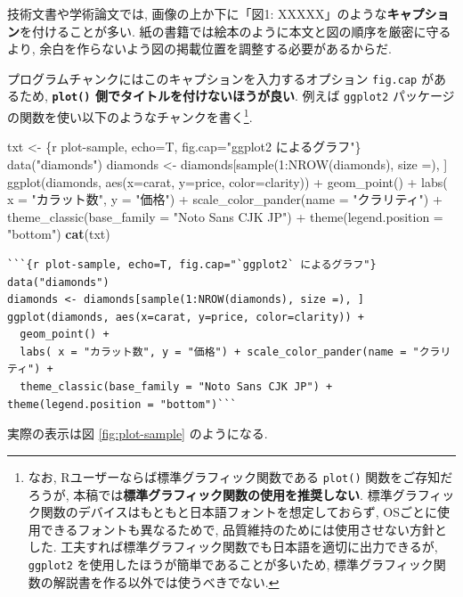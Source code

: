 \documentclass[
  nomag]{bxjsbook}
\newenvironment{Shaded}{\begin{snugshade}}{\end{snugshade}}
\newcommand{\KeywordTok}[1]{\textcolor[rgb]{0.13,0.29,0.53}{\textbf{#1}}}
\newcommand{\NormalTok}[1]{#1}
\newcommand{\StringTok}[1]{\textcolor[rgb]{0.31,0.60,0.02}{#1}}
\theoremstyle{definition}
\theoremstyle{definition}
\theoremstyle{definition}
\theoremstyle{remark}
\begin{document}
技術文書や学術論文では, 画像の上か下に「図1:
XXXXX」のような\textbf{キャプション}を付けることが多い.
紙の書籍では絵本のように本文と図の順序を厳密に守るより,
余白を作らないよう図の掲載位置を調整する必要があるからだ.

プログラムチャンクにはこのキャプションを入力するオプション
\texttt{fig.cap} があるため, \textbf{\texttt{plot()}
側でタイトルを付けないほうが良い}. 例えば \texttt{ggplot2}
パッケージの関数を使い以下のようなチャンクを書く\footnote{なお,
  Rユーザーならば標準グラフィック関数である \texttt{plot()}
  関数をご存知だろうが,
  本稿では\textbf{標準グラフィック関数の使用を推奨しない}.
  標準グラフィック関数のデバイスはもともと日本語フォントを想定しておらず,
  OSごとに使用できるフォントも異なるためで,
  品質維持のためには使用させない方針とした.
  工夫すれば標準グラフィック関数でも日本語を適切に出力できるが,
  \texttt{ggplot2} を使用したほうが簡単であることが多いため,
  標準グラフィック関数の解説書を作る以外では使うべきでない.}.

\begin{Shaded}
\begin{Highlighting}[numbers=left,,]
\NormalTok{txt \textless{}{-}}\StringTok{ \textquotesingle{}\textasciigrave{}\textasciigrave{}\textasciigrave{}\{r plot{-}sample, echo=T, fig.cap="\textasciigrave{}ggplot2\textasciigrave{} によるグラフ"\}}
\StringTok{data("diamonds")}
\StringTok{diamonds \textless{}{-} diamonds[sample(1:NROW(diamonds), size =), ]}
\StringTok{ggplot(diamonds, aes(x=carat, y=price, color=clarity)) +}
\StringTok{  geom\_point() +}
\StringTok{  labs( x = "カラット数", y = "価格") + scale\_color\_pander(name = "クラリティ") +}
\StringTok{  theme\_classic(base\_family = "Noto Sans CJK JP") + theme(legend.position = "bottom")\textasciigrave{}\textasciigrave{}\textasciigrave{}\textquotesingle{}}
\KeywordTok{cat}\NormalTok{(txt)}
\end{Highlighting}
\end{Shaded}

\begin{verbatim}
```{r plot-sample, echo=T, fig.cap="`ggplot2` によるグラフ"}
data("diamonds")
diamonds <- diamonds[sample(1:NROW(diamonds), size =), ]
ggplot(diamonds, aes(x=carat, y=price, color=clarity)) +
  geom_point() +
  labs( x = "カラット数", y = "価格") + scale_color_pander(name = "クラリティ") +
  theme_classic(base_family = "Noto Sans CJK JP") + theme(legend.position = "bottom")```
\end{verbatim}

実際の表示は図 \ref{fig:plot-sample} のようになる.
\end{document}
